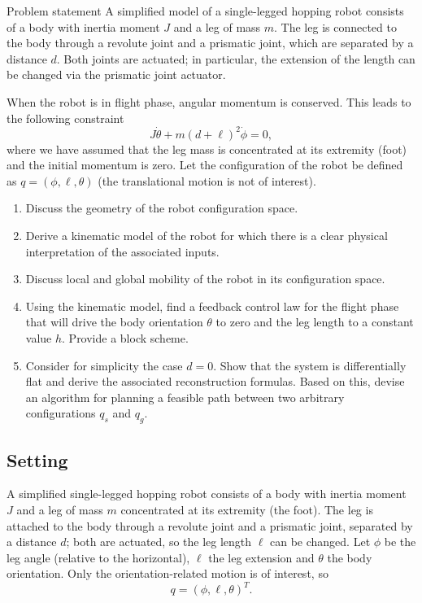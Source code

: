 \documentclass[11pt,a4paper]{article}
\def\boldsymbol#1{#1}%
\newcommand{\q}{\boldsymbol{q}}
\theoremstyle{definition}
\theoremstyle{plain}
\theoremstyle{remark}
\begin{document}
\begin{problem}{Problem statement}
A simplified model of a single-legged hopping robot consists of a body with inertia moment $J$ and a leg of mass $m$. The leg is connected to the body through a revolute joint and a prismatic joint, which are separated by a distance $d$. Both joints are actuated; in particular, the extension of the length can be changed via the prismatic joint actuator.

When the robot is in flight phase, angular momentum is conserved. This leads to the following constraint
\[
  J\dot\theta+m(d+\ell)^2\dot\phi=0,
\]
where we have assumed that the leg mass is concentrated at its extremity (foot) and the initial momentum is zero.
Let the configuration of the robot be defined as $\q=(\phi,\ell,\theta)$ (the translational motion is not of interest).
\begin{enumerate}[label=(\alph*),nosep]
  \item Discuss the geometry of the robot configuration space.
  \item Derive a kinematic model of the robot for which there is a clear physical interpretation of the associated inputs.
  \item Discuss local and global mobility of the robot in its configuration space.
  \item Using the kinematic model, find a feedback control law for the flight phase that will drive the body orientation $\theta$ to zero and the leg length to a constant value $h$. Provide a block scheme.
  \item Consider for simplicity the case $d=0$. Show that the system is differentially flat and derive the associated reconstruction formulas. Based on this, devise an algorithm for planning a feasible path between two arbitrary configurations $\q_s$ and $\q_g$.
\end{enumerate}
\end{problem}


\subsection{Setting}

A simplified single-legged hopping robot consists of a body with inertia moment $J$ and a leg of mass $m$ concentrated at its extremity (the foot). The leg is attached to the body through a revolute joint and a prismatic joint, separated by a distance $d$; both are actuated, so the leg length $\ell$ can be changed. Let $\phi$ be the leg angle (relative to the horizontal), $\ell$ the leg extension and $\theta$ the body orientation. Only the orientation-related motion is of interest, so
\[
  \q=(\phi,\ell,\theta)^T .
\]
\end{document}
